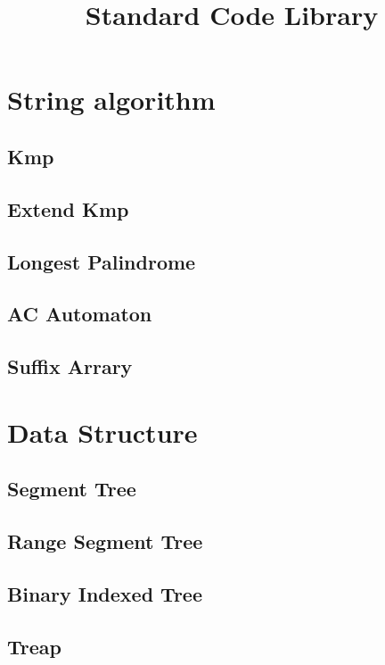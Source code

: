 \documentclass[twoside]{article}
\title{Standard Code Library}
\author{}
\newcommand\blankpage{ \null\thispagestyle{empty}\addtocounter{page}{-1}\newpage }
\begin{document}
	\maketitle
	\afterpage{\blankpage}

	\newpage
	\tableofcontents

	\newpage
	\section{String algorithm}
		\subsection{Kmp}
			
		\subsection{Extend Kmp}
			
		\subsection{Longest Palindrome}
			
		\subsection{AC Automaton}
			
		\subsection{Suffix Arrary}
			
	\newpage
	\section{Data Structure}
		\subsection{Segment Tree}
			
		\subsection{Range Segment Tree}
			
		\subsection{Binary Indexed Tree}
			
		\subsection{Treap}
			
\end{document}
